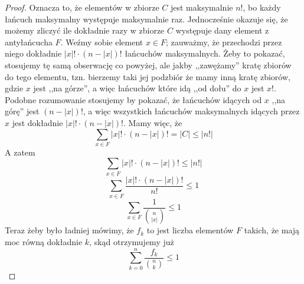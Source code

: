 \begin{proof}
       Oznacza to, że elementów w zbiorze $C$ jest maksymalnie $n!$, bo każdy łańcuch maksymalny występuje maksymalnie raz. Jednocześnie okazuje się, że możemy zliczyć ile dokładnie razy w zbiorze $C$ występuje dany element z antyłańcucha $F$. Weźmy sobie element $x \in F$; zauważmy, że przechodzi przez niego dokładnie $|x|! \cdot (n - |x|)!$ łańcuchów maksymalnych. Żeby to pokazać, stosujemy tę samą obserwację co powyżej, ale jakby ,,zawężamy'' kratę zbiorów do tego elementu, tzn. bierzemy taki jej podzbiór że mamy inną kratę zbiorów, gdzie $x$ jest ,,na górze'', a więc łańcuchów które idą ,,od dołu'' do $x$ jest $x!$. Podobne rozumowanie stosujemy by pokazać, że łańcuchów idących od $x$ ,,na górę'' jest $(n - |x|)!$, a więc wszystkich łańcuchów maksymalnych idących przez $x$ jest dokładnie $|x|! \cdot (n - |x|)!$. 
       Mamy więc, że
       \begin{equation*}
            \sum_{x \in F} |x|! \cdot (n - |x|)! = |C| \leq |n!|
       \end{equation*}
       A zatem 
       \begin{equation*}
            \sum_{x \in F} |x|! \cdot (n - |x|)! \leq |n!|
       \end{equation*}
        \begin{equation*}
            \sum_{x \in F} \frac{|x|! \cdot (n - |x|)!}{n!} \leq 1
       \end{equation*}
       \begin{equation*}
            \sum_{x \in F} \frac{1}{\binom{n}{|x|}} \leq 1
       \end{equation*}
       Teraz żeby było ładniej mówimy, że $f_k$ to jest liczba elementów $F$ takich, że mają moc równą dokładnie $k$, skąd otrzymujemy już 
        \begin{equation*}
           \sum_{k=0}^{n} \frac{f_k}{\binom{n}{k}} \leq 1 
       \end{equation*}
     \end{proof}